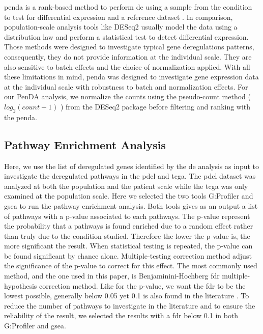 \acrshort{penda} is a rank-based method to perform \acrshort{de} using a sample from the condition to test for differential expression and a reference dataset \cite*{Richard2020}.
In comparison, population-scale analysis tools like DESeq2 usually model the data using a distribution law and perform a statistical test to detect differential expression.
Those methods were designed to investigate typical gene deregulations patterns, consequently, they do not provide information at the individual scale.
They are also sensitive to batch effects and the choice of normalization applied.
With all these limitations in mind, \acrshort{penda} was designed to investigate gene expression data at the individual scale with robustness to batch and normalization effects.
For our PenDA analysis, we normalize the counts using the pseudo-count method ( $log_2(count + 1)$ ) from the DESeq2 package before filtering and ranking with the \acrshort{penda}.

\subsection{Pathway Enrichment Analysis}

Here, we use the list of deregulated genes identified by the \acrlong{de} analysis as input to investigate the deregulated pathways in the \acrshort{pdcl} and \acrshort{tcga}.
The \acrlong{pdcl} dataset was analyzed at both the population and the patient scale while the \acrshort{tcga} was only examined at the population scale.
Here we selected the two tools G:Profiler and \acrfull{gsea} to run the pathway enrichment analysis.
Both tools gives as an output a list of pathways with a p-value associated to each pathways.
The p-value represent the probability that a pathways is found enriched due to a random effect rather than truly due to the condition studied.
Therefore the lower the p-value is, the more significant the result.
When statistical testing is repeated, the p-value can be found significant by chance alone.
Multiple-testing correction method adjust the significance of the p-value to correct for this effect.
The most commonly used method, and the one used in this paper, is Benjaminini-Hochberg \acrfull{fdr} multiple-hypothesis correction method.
Like for the p-value, we want the \acrshort{fdr} to be the lowest possible, generally below 0.05 yet 0.1 is also found in the literature \cite*{Reimand2019}.
To reduce the number of pathways to investigate in the literature and to ensure the reliability of the result, we selected the results with a \acrshort{fdr} below 0.1 in both G:Profiler and \acrshort{gsea}.


